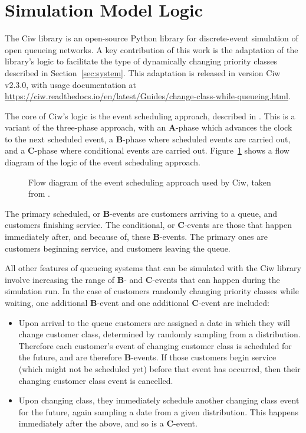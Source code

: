 \documentclass{article}
\begin{document}
\section{Simulation Model Logic}\label{sec:simulation}
The Ciw library \cite{palmer19} is an open-source Python library for
discrete-event simulation of open queueing networks. A key contribution of this
work is the adaptation of the library's logic to facilitate the type of
dynamically changing priority classes described in Section~\ref{sec:system}.
This adaptation is released in version Ciw v2.3.0, with usage documentation at
\url{https://ciw.readthedocs.io/en/latest/Guides/change-class-while-queueing.html}.

The core of Ciw's logic is the event scheduling approach, described in
\cite{robinson14}. This is a variant of the three-phase approach, with an
\textbf{A}-phase which advances the clock to the next scheduled event, a
\textbf{B}-phase where scheduled events are carried out, and a \textbf{C}-phase
where conditional events are carried out. Figure~\ref{fig:eventscheduling} shows
a flow diagram of the logic of the event scheduling approach.

\begin{figure}
    \centering
    
    \caption{Flow diagram of the event scheduling approach used by Ciw, taken from \cite{palmer18}.}
    \label{fig:eventscheduling}
\end{figure}

The primary scheduled, or \textbf{B}-events are customers arriving to a queue,
and customers finishing service. The conditional, or \textbf{C}-events are those
that happen immediately after, and because of, these \textbf{B}-events. The
primary ones are customers beginning service, and customers leaving the queue.

All other features of queueing systems that can be simulated with the Ciw
library involve increasing the range of \textbf{B}- and \textbf{C}-events that
can happen during the simulation run.
In the case of customers randomly changing priority classes while waiting, one
additional \textbf{B}-event and one additional \textbf{C}-event are included:

\begin{itemize}
  \item Upon arrival to the queue customers are assigned a date in which they
  will change customer class, determined by randomly sampling from a
  distribution. Therefore each customer's event of changing customer class is
  scheduled for the future, and are therefore \textbf{B}-events. If those
  customers begin service (which might not be scheduled yet) before that event
  has occurred, then their changing customer class event is cancelled.
  \item Upon changing class, they immediately schedule another changing class
  event for the future, again sampling a date from a given distribution. This
  happens immediately after the above, and so is a \textbf{C}-event.
\end{itemize}
\end{document}
